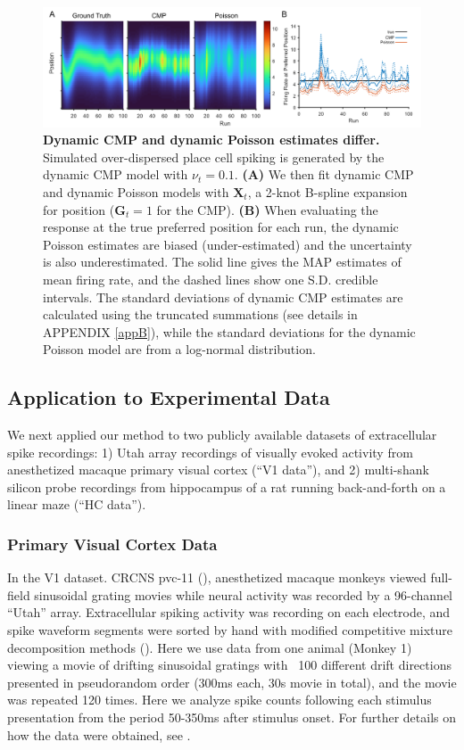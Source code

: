 \documentclass[aoas]{imsart}
\theoremstyle{plain}
\theoremstyle{remark}
\begin{document}
\begin{figure}[h!]
	\centering
	\includegraphics[width=1\textwidth]{figure3.png}
	\caption{\textbf{Dynamic CMP and dynamic Poisson estimates differ.} Simulated over-dispersed place cell spiking is generated by the dynamic CMP model with $\nu_t = 0.1$. \textbf{(A)} We then fit dynamic CMP and dynamic Poisson models with $\bm{X}_t$, a 2-knot B-spline expansion for position ($\bm{G}_t = 1$ for the CMP). \textbf{(B)} When evaluating the response at the true preferred position for each run, the dynamic Poisson estimates are biased (under-estimated) and the uncertainty is also underestimated. The solid line gives the MAP estimates of mean firing rate, and the dashed lines show one S.D. credible intervals. The standard deviations of dynamic CMP estimates are calculated using the truncated summations (see details in APPENDIX \ref{appB}), while the standard deviations for the dynamic Poisson model are from a log-normal distribution.}
	\label{fig3}
\end{figure}

\subsection{Application to Experimental Data}
We next applied our method to two publicly available datasets of extracellular spike recordings: 1) Utah array recordings of visually evoked activity from anesthetized macaque primary visual cortex (“V1 data”), and 2) multi-shank silicon probe recordings from hippocampus of a rat running back-and-forth on a linear maze (“HC data”).

\subsubsection{Primary Visual Cortex Data}
In the V1 dataset. CRCNS pvc-11 (\cite{Kohn2016}), anesthetized macaque monkeys viewed full-field sinusoidal grating movies while neural activity was recorded by a 96-channel “Utah” array. Extracellular spiking activity was recording on each electrode, and spike waveform segments were sorted by hand with modified competitive mixture decomposition methods (\cite{Shoham2003}). Here we use data from one animal (Monkey 1) viewing a movie of drifting sinusoidal gratings with ~100 different drift directions presented in pseudorandom order (300ms each, 30s movie in total), and the movie was repeated 120 times. Here we analyze spike counts following each stimulus presentation from the period 50-350ms after stimulus onset. For further details on how the data were obtained, see \cite{Kelly2010,Smith2008}.
\end{document}
